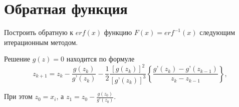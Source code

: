 \section{Обратная функция}
Построить обратную к $erf(x)$ функцию $F(x) = erf^{-1}(x)$ следующим итерационным методом.

Решение $g(z) = 0$ находится по формуле
$$
	z_{k+1} = z_k - \frac{g(z_k)}{g’(z_k)} - \frac{1}{2} \frac{\left[ g(z_k) \right]^2}{\left[g’(z_k) \right]^3} \left\{ \frac{g’(z_k) - g’(z_{k-1})}{z_k - z_{k-1}} \right\},
$$

При этом $z_0 = x_i$, а $z_1 = z_0 - \frac{g(z_0)}{g’(z_0)}$.

